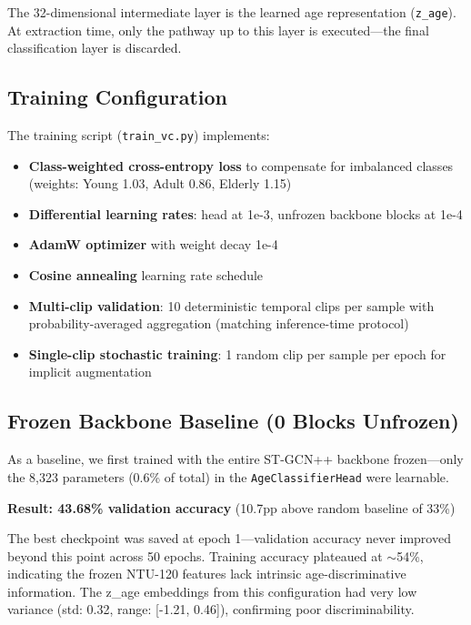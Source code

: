 \documentclass[9pt,a4paper,twocolumn,twoside]{tau-class/tau}
\begin{document}
The 32-dimensional intermediate layer is the learned age representation (\texttt{z\_age}). At extraction time, only the pathway up to this layer is executed---the final classification layer is discarded.

\subsection{Training Configuration}

The training script (\texttt{train\_vc.py}) implements:

\begin{itemize}
    \item \textbf{Class-weighted cross-entropy loss} to compensate for imbalanced classes (weights: Young 1.03, Adult 0.86, Elderly 1.15)
    \item \textbf{Differential learning rates}: head at 1e-3, unfrozen backbone blocks at 1e-4
    \item \textbf{AdamW optimizer} with weight decay 1e-4
    \item \textbf{Cosine annealing} learning rate schedule
    \item \textbf{Multi-clip validation}: 10 deterministic temporal clips per sample with probability-averaged aggregation (matching inference-time protocol)
    \item \textbf{Single-clip stochastic training}: 1 random clip per sample per epoch for implicit augmentation
\end{itemize}

\subsection{Frozen Backbone Baseline (0 Blocks Unfrozen)}

As a baseline, we first trained with the entire ST-GCN++ backbone frozen---only the 8,323 parameters (0.6\% of total) in the \texttt{AgeClassifierHead} were learnable.

\textbf{Result: 43.68\% validation accuracy} (10.7pp above random baseline of 33\%)

The best checkpoint was saved at epoch 1---validation accuracy never improved beyond this point across 50 epochs. Training accuracy plateaued at $\sim$54\%, indicating the frozen NTU-120 features lack intrinsic age-discriminative information. The z\_age embeddings from this configuration had very low variance (std: 0.32, range: [-1.21, 0.46]), confirming poor discriminability.
\end{document}
